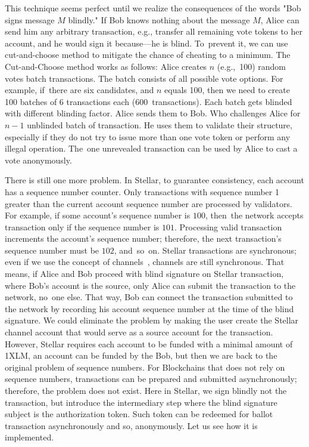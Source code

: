 \documentclass[applsci,article,accept,moreauthors,pdftex]{Definitions/mdpi}
\begin{document}
This technique seems perfect until we realize the consequences of the words "Bob signs message $M$ blindly." If Bob knows nothing about the message $M$, Alice can send him any arbitrary transaction, e.g., transfer all remaining vote tokens to her account, and he would sign it because––he is blind. To~prevent it, we can use cut-and-choose
 method to mitigate the chance of cheating to a minimum.
The Cut-and-Choose method works as follows: Alice creates $n$ (e.g.,~100) random votes batch transactions. The batch consists of all possible vote options. For example, if~there are six candidates, and $n$ equals 100, then we need to create 100 batches of 6 transactions each (600~transactions). Each batch gets blinded with different blinding factor. Alice sends them to Bob. Who challenges Alice for \(n-1\) unblinded batch of transaction. He uses them to validate their structure, especially if they do not try to issue more than one vote token or perform any illegal operation. The~one unrevealed transaction can be used by Alice to cast a vote anonymously.

There is still one more problem. In Stellar, to guarantee consistency, each account has a sequence number counter. Only transactions with sequence number 1 greater than the current account sequence number are processed by validators. For example, if some account's sequence number is $100$, then~the network accepts transaction only if the sequence number is $101$. Processing valid transaction increments the account's sequence number; therefore, the next transaction's sequence number must be $102$, and~so~on. Stellar transactions are synchronous; even if we use the concept of channels~\cite{Channels80:online}, channels are still synchronous. That means, if Alice and Bob proceed with blind signature on Stellar transaction, where Bob's account is the source, only Alice can submit the transaction to the network, no~one else. That way, Bob can connect the transaction submitted to the network by recording his account sequence number at the time of the blind signature. We could eliminate the problem by making the user create the Stellar channel account that would serve as a source account for the transaction. However, Stellar requires each account to be funded with a minimal amount of 1XLM, an account can be funded by the Bob, but then we are back to the original problem of sequence numbers. For Blockchains that does not rely on sequence numbers, transactions can be prepared and submitted asynchronously; therefore, the problem does not exist. Here in Stellar, we sign blindly not the transaction, but introduce the intermediary step where the blind signature subject is the authorization token. Such token can be redeemed for ballot transaction asynchronously and so, anonymously. Let us see how it is implemented. 
\end{document}
